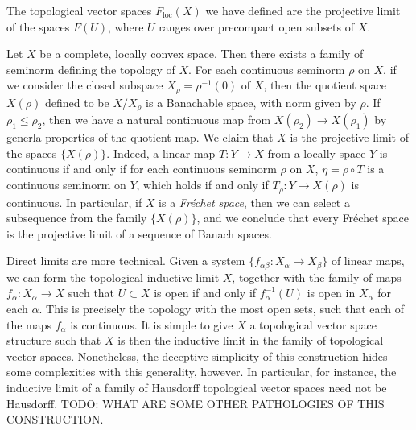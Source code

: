 \begin{example}
    The topological vector spaces $F_{\text{loc}}(X)$ we have defined are the projective limit of the spaces $F(U)$, where $U$ ranges over precompact open subsets of $X$.
\end{example}

\begin{example}
    Let $X$ be a complete, locally convex space. Then there exists a family of seminorm defining the topology of $X$. For each continuous seminorm $\rho$ on $X$, if we consider the closed subspace $X_\rho = \rho^{-1}(0)$ of $X$, then the quotient space $X(\rho)$ defined to be $X / X_\rho$ is a Banachable space, with norm given by $\rho$. If $\rho_1 \leq \rho_2$, then we have a natural continuous map from $X(\rho_2) \to X(\rho_1)$ by generla properties of the quotient map. We claim that $X$ is the projective limit of the spaces $\{ X(\rho) \}$. Indeed, a linear map $T: Y \to X$ from a locally space $Y$ is continuous if and only if for each continuous seminorm $\rho$ on $X$, $\eta = \rho \circ T$ is a continuous seminorm on $Y$, which holds if and only if $T_\rho: Y \to X(\rho)$ is continuous. In particular, if $X$ is a \emph{Fr\'{e}chet space}, then we can select a subsequence from the family $\{ X(\rho) \}$, and we conclude that every Fr\'{e}chet space is the projective limit of a sequence of Banach spaces.
\end{example}

Direct limits are more technical. Given a system $\{ f_{\alpha \beta}: X_\alpha \to X_\beta \}$ of linear maps, we can form the topological inductive limit $X$, together with the family of maps $f_\alpha: X_\alpha \to X$ such that $U \subset X$ is open if and only if $f_\alpha^{-1}(U)$ is open in $X_\alpha$ for each $\alpha$. This is precisely the topology with the most open sets, such that each of the maps $f_\alpha$ is continuous. It is simple to give $X$ a topological vector space structure such that $X$ is then the inductive limit in the family of topological vector spaces. Nonetheless, the deceptive simplicity of this construction hides some complexities with this generality, however. In particular, for instance, the inductive limit of a family of Hausdorff topological vector spaces need not be Hausdorff. TODO: WHAT ARE SOME OTHER PATHOLOGIES OF THIS CONSTRUCTION.

